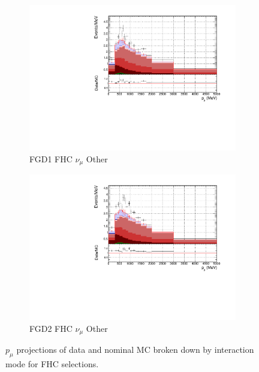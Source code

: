 \begin{figure}[!t]
\begin{subfigure}{0.49\textwidth}
  \centering
  \includegraphics[width=\textwidth]{figs/FGD1_numuCC_other_p}
  \caption{FGD1 FHC $\nu_{\mu}$ Other}
\end{subfigure}
\begin{subfigure}{0.49\textwidth}
  \centering
  \includegraphics[width=\textwidth]{figs/FGD2_numuCC_other_p}
  \caption{FGD2 FHC $\nu_{\mu}$ Other}
\end{subfigure}
\caption{$p_{\mu}$ projections of data and nominal MC broken down by interaction mode for FHC selections.}
\label{fig:pstack_fhc}
\end{figure}


